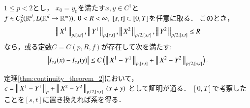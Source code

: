 	\begin{screen}
		\begin{cor}\label{cor:continuity_theorem_2}
			$1 \leq p < 2$とし，
			$x_0 = y_0$を満たす$x,y \in C^1$と$f \in C^2_b(\mathbb{R}^d,L(\mathbb{R}^d \rightarrow \mathbb{R}^m)),\ 0 < R < \infty,\ [s,t] \subset [0,T]$を任意に取る．
			このとき，
			\begin{align}
				\left\|\, X^1\, \right\|_{p,[s,t]},\left\|\, Y^1\, \right\|_{p,[s,t]}, \left\|\, X^2\, \right\|_{p/2,[s,t]},\left\|\, Y^2\, \right\|_{p/2,[s,t]} \leq R
			\end{align}
			なら，或る定数$C = C(p,R,f)$が存在して次を満たす:
			\begin{align}
				\left| I_{s,t}(x) - I_{s,t}(y) \right| \leq C\left( \left\|\, X^1 - Y^1\, \right\|_{p,[s,t]}+\left\|\, X^2 - Y^2\, \right\|_{p/2,[s,t]} \right).
			\end{align}
		\end{cor}
	\end{screen}
	
	\begin{prf}
		定理\ref{thm:continuity_theorem_2}において，
		$\epsilon = \left\|\, X^1 - Y^1\, \right\|_{p} + \left\|\, X^2 - Y^2\, \right\|_{p/2,[s,t]}\ (x \neq y)$
		として証明が通る．
		$[0,T]$で考察したことを$[s,t]$に置き換えれば系を得る．
		\QED
	\end{prf}
	
